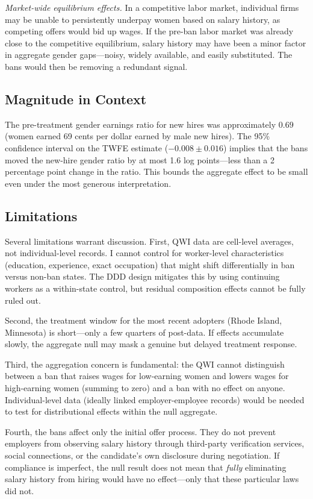 \documentclass[12pt]{article}
\begin{document}
\textit{Market-wide equilibrium effects.} In a competitive labor market, individual firms may be unable to persistently underpay women based on salary history, as competing offers would bid up wages. If the pre-ban labor market was already close to the competitive equilibrium, salary history may have been a minor factor in aggregate gender gaps---noisy, widely available, and easily substituted. The bans would then be removing a redundant signal.

\subsection{Magnitude in Context}

The pre-treatment gender earnings ratio for new hires was approximately $0.69$ (women earned 69 cents per dollar earned by male new hires). The 95\% confidence interval on the TWFE estimate ($-0.008 \pm 0.016$) implies that the bans moved the new-hire gender ratio by at most 1.6 log points---less than a 2 percentage point change in the ratio. This bounds the aggregate effect to be small even under the most generous interpretation.

\subsection{Limitations}

Several limitations warrant discussion. First, QWI data are cell-level averages, not individual-level records. I cannot control for worker-level characteristics (education, experience, exact occupation) that might shift differentially in ban versus non-ban states. The DDD design mitigates this by using continuing workers as a within-state control, but residual composition effects cannot be fully ruled out.

Second, the treatment window for the most recent adopters (Rhode Island, Minnesota) is short---only a few quarters of post-data. If effects accumulate slowly, the aggregate null may mask a genuine but delayed treatment response.

Third, the aggregation concern is fundamental: the QWI cannot distinguish between a ban that raises wages for low-earning women and lowers wages for high-earning women (summing to zero) and a ban with no effect on anyone. Individual-level data (ideally linked employer-employee records) would be needed to test for distributional effects within the null aggregate.

Fourth, the bans affect only the initial offer process. They do not prevent employers from observing salary history through third-party verification services, social connections, or the candidate's own disclosure during negotiation. If compliance is imperfect, the null result does not mean that \textit{fully} eliminating salary history from hiring would have no effect---only that these particular laws did not.
\end{document}
